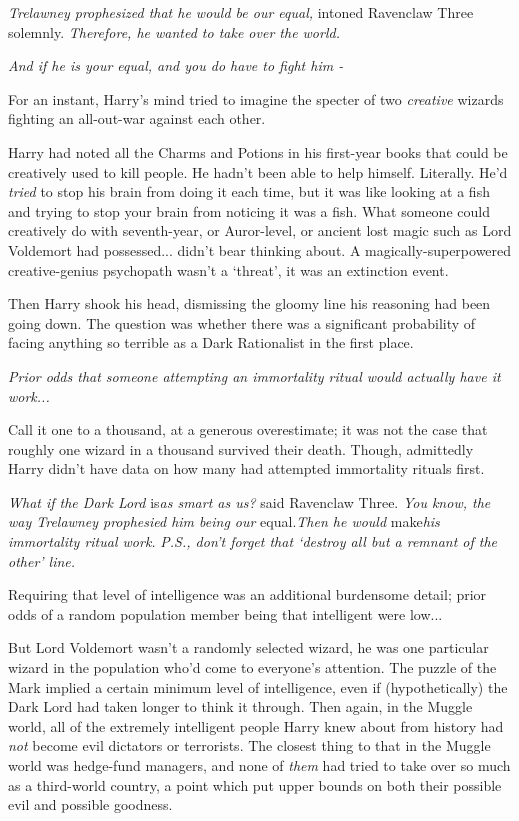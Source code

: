 \emph{Trelawney prophesized that he would be our equal,} intoned
Ravenclaw Three solemnly. \emph{Therefore, he wanted to take over the
world.}

\emph{And if he is your equal, and you do have to fight him -}

For an instant, Harry's mind tried to imagine the specter of two
\emph{creative} wizards fighting an all-out-war against each other.

Harry had noted all the Charms and Potions in his first-year books that
could be creatively used to kill people. He hadn't been able to help
himself. Literally. He'd \emph{tried} to stop his brain from doing it
each time, but it was like looking at a fish and trying to stop your
brain from noticing it was a fish. What someone could creatively do with
seventh-year, or Auror-level, or ancient lost magic such as Lord
Voldemort had possessed... didn't bear thinking about. A
magically-superpowered creative-genius psychopath wasn't a `threat', it
was an extinction event.

Then Harry shook his head, dismissing the gloomy line his reasoning had
been going down. The question was whether there was a significant
probability of facing anything so terrible as a Dark Rationalist in the
first place.

\emph{Prior odds that someone attempting an immortality ritual would
actually have it work...}

Call it one to a thousand, at a generous overestimate; it was not the
case that roughly one wizard in a thousand survived their death. Though,
admittedly Harry didn't have data on how many had attempted immortality
rituals first.

\emph{What if the Dark Lord} is\emph{as smart as us?} said Ravenclaw
Three. \emph{You know, the way Trelawney prophesied him being our}
equal.\emph{Then he would} make\emph{his immortality ritual work.}
\emph{P.S., don't forget that `destroy all but a remnant of the other'
line.}

Requiring that level of intelligence was an additional burdensome
detail; prior odds of a random population member being that intelligent
were low...

But Lord Voldemort wasn't a randomly selected wizard, he was one
particular wizard in the population who'd come to everyone's attention.
The puzzle of the Mark implied a certain minimum level of intelligence,
even if (hypothetically) the Dark Lord had taken longer to think it
through. Then again, in the Muggle world, all of the extremely
intelligent people Harry knew about from history had \emph{not} become
evil dictators or terrorists. The closest thing to that in the Muggle
world was hedge-fund managers, and none of \emph{them} had tried to take
over so much as a third-world country, a point which put upper bounds on
both their possible evil and possible goodness.

